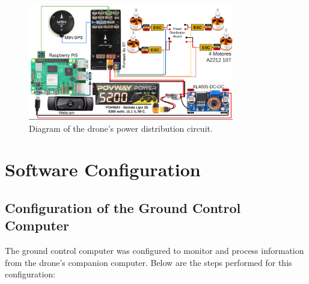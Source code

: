         \begin{center}
            \begin{figure}[H]
                \centering
                \includegraphics[width=0.8\textwidth]{pictures/drone_electronic_diagram.png}
                \caption{Diagram of the drone's power distribution circuit.}
            \end{figure}
        \end{center}
    
        

\section{Software Configuration}

\subsection{Configuration of the Ground Control Computer} 
The ground control computer was configured to monitor and process information from the drone's companion computer. Below are the steps performed for this configuration:

